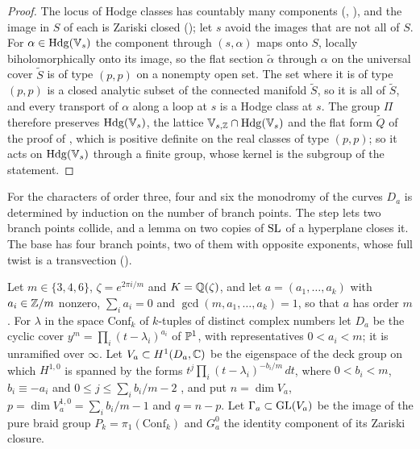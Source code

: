 \begin{proof}
The locus of Hodge classes has countably many components
(, ), and the image in $S$ of
each is Zariski closed (); let $s$ avoid the images that are
not all of $S$. For $\alpha\in\mathrm{Hdg}(\mathbb{V}_{s})$ the component through
$(s,\alpha)$ maps onto $S$, locally biholomorphically onto its image, so the
flat section $\tilde\alpha$ through $\alpha$ on the universal cover $\tilde S$
is of type $(p,p)$ on a nonempty open set. The set where it is of type
$(p,p)$ is a closed analytic subset of the connected manifold $\tilde S$, so it
is all of $\tilde S$, and every transport of $\alpha$ along a loop at $s$ is a
Hodge class at $s$. The group $\Pi$ therefore preserves
$\mathrm{Hdg}(\mathbb{V}_{s})$, the lattice $\mathbb{V}_{s,\mathbb{Z}}\cap\mathrm{Hdg}(\mathbb{V}_{s})$
and the flat form $\tilde Q$ of the proof of , which is
positive definite on the real classes of type $(p,p)$; so it acts on
$\mathrm{Hdg}(\mathbb{V}_{s})$ through a finite group, whose kernel is the subgroup
of the statement.
\end{proof}

For the characters of order three, four and six the monodromy of the
curves $D_{a}$ is determined by induction on the number of branch points. The
step lets two branch points collide, and a lemma on two copies of $\operatorname{SL}$ of a
hyperplane closes it. The base has four branch points, two of them with
opposite exponents, whose full twist is a transvection
().

\begin{setupenv}\label{setup:cyclic}
Let $m\in\{3,4,6\}$, $\zeta=e^{2\pi i/m}$ and $K=\mathbb{Q}(\zeta)$, and let
$a=(a_{1},\dots,a_{k})$ with $a_{i}\in\mathbb{Z}/m$ nonzero, $\sum_{i}a_{i}=0$ and
$\gcd(m,a_{1},\dots,a_{k})=1$, so that $a$ has order $m$. For $\lambda$ in
the space $\mathrm{Conf}_{k}$ of $k$-tuples of distinct complex numbers let
$D_{a}$ be the cyclic cover $y^{m}=\prod_{i}(t-\lambda_{i})^{a_{i}}$ of
$\mathbb{P}^{1}$, with representatives $0<a_{i}<m$; it is unramified over
$\infty$. Let $V_{a}\subset H^{1}(D_{a},\mathbb{C})$ be the eigenspace of the deck
group on which $H^{1,0}$ is spanned by the forms
$t^{j}\prod_{i}(t-\lambda_{i})^{-b_{i}/m}\,dt$, where $0<b_{i}<m$, $b_{i}\equiv
-a_{i}$ and $0\le j\le\sum_{i}b_{i}/m-2$ \cite[\S2]{DM86}, and put
$n=\dim V_{a}$,
$p=\dim V_{a}^{1,0}=\sum_{i}b_{i}/m-1$ and $q=n-p$. Let $\Gamma_{a}\subset
\operatorname{GL}(V_{a})$ be the image of the pure braid group
$P_{k}=\pi_{1}(\mathrm{Conf}_{k})$ and $G_{a}^{0}$ the identity component of
its Zariski closure.
\end{setupenv}

